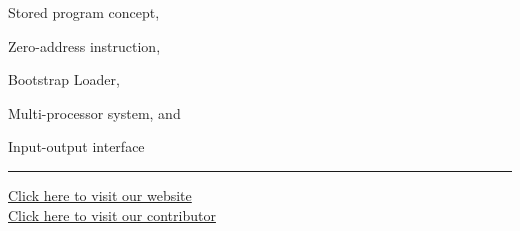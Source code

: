 \documentclass[11pt,a4paper]{article}
\begin{document}
\begin{parts}
  \item Stored program concept,
  \item Zero-address instruction,
  \item Bootstrap Loader,
  \item Multi-processor system, and
  \item Input-output interface
\end{parts}

\vfill
\rule{\linewidth}{0.4pt}

\begin{center}\small
\href{https://bhu-exam.vercel.app/}{Click here to visit our website}\\[4pt]
\href{https://me-aryan.vercel.app/}{Click here to visit our contributor}
\end{center}
\end{document}
